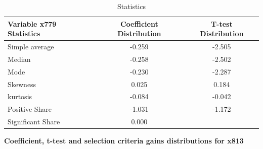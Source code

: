 \documentclass{article}
\begin{document}
\begin{table}[!h]
    \centering
    \caption{Statistics}
    \begin{tabular}{|l|c|c|}
    \hline
    Variable x779 Statistics &  Coefficient Distribution &  T-test Distribution  \\
    \hline
    \hline
    Simple average    & -0.259      & -2.505 \\
    \hline
    Median            & -0.258   & -2.502 \\
    \hline
    Mode              & -0.230     & -2.287 \\
    \hline
    Skewness          & 0.025      & 0.184 \\
    \hline
    kurtosis          & -0.084     & -0.042 \\
    \hline
    Positive Share    & -1.031     & -1.172 \\
    \hline
    Significant Share & 0.000 &  \\
    \hline
    \end{tabular}
\end{table}

\clearpage
\begin{center}
    \large{\textbf{Coefficient, t-test and selection criteria gains distributions for x813 }}
\end{center}

\vspace{-5mm}
\end{document}
